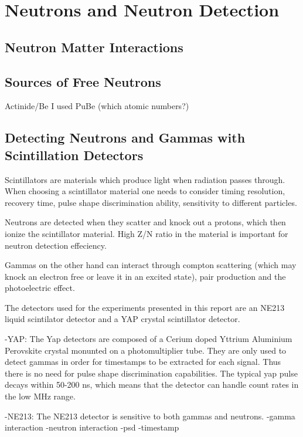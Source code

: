 \documentclass[main.tex]{subfiles}
\begin{document}
\section{Neutrons and Neutron Detection}

\subsection{Neutron Matter Interactions}

\subsection{Sources of Free Neutrons}
Actinide/Be
I used PuBe (which atomic numbers?)

\subsection{Detecting Neutrons and Gammas with Scintillation Detectors}
Scintillators are materials which produce light when radiation passes through. When choosing a scintillator material one needs to consider timing resolution, recovery time, pulse shape discrimination ability, sensitivity to different particles.

Neutrons are detected when they scatter and knock out a protons, which then ionize the scintillator material. High Z/N ratio in the material is important for neutron detection effeciency.

Gammas on the other hand can interact through compton scattering (which may knock an electron free or leave it in an excited state), pair production and the photoelectric effect.

The detectors used for the experiments presented in this report are an NE213 liquid scintilator detector and a YAP crystal scintillator detector.

-YAP: The Yap detectors are composed of a Cerium doped Yttrium Aluminium Perovskite crystal monunted on a photomultiplier tube.
They are only used to detect gammas in order for timestamps to be extracted for each signal. Thus there is no need for pulse shape discrimination capabilities. The typical yap pulse decays within 50-200 ns, which means that the detector can handle count rates in the low MHz range.

-NE213: The NE213 detector is sensitive to both gammas and neutrons. 
-gamma interaction
-neutron interaction
-psd
-timestamp
\end{document}
